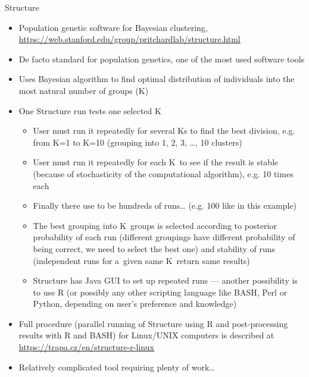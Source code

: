 \documentclass[compress, ucs, xelatex, 11pt, xcolor=svgnames,
  hyperref={
    bookmarks=true,
    unicode=true,
    colorlinks=true,
    pdftitle={Molecular data in R},
    plainpages=false,
    pdfauthor={Vojtech Zeisek},
    pdfsubject={Course about phylogeny and evolution in R},
    pdfcreator={XeLaTeX},
    pdfkeywords={R, evolution, phylogeny, molecular data},
    linkcolor=Tomato,
    anchorcolor=SaddleBrown,
    citecolor=Goldenrod,
    filecolor=DarkMagenta,
    menucolor=Sienna,
    urlcolor=DarkTurquoise,
    pdftex},
  url={hyphens, lowtilde} %
  ]{beamer}
\begin{document}
\begin{frame}[allowframebreaks]{Structure}
  \label{structure}
  \begin{itemize}
    \item Population genetic software for Bayesian clustering, \url{https://web.stanford.edu/group/pritchardlab/structure.html}
    \item De facto standard for population genetics, one of the most used software tools
    \item Uses Bayesian algorithm to find optimal distribution of individuals into the most natural number of groups (K)
    \item One Structure run tests one selected K
    \begin{itemize}
      \item User must run it repeatedly for several Ks to find the best division, e.g. from K=1 to K=10 (grouping into 1, 2, 3, \ldots, 10 clusters)
      \item User must run it repeatedly for each K~to see if the result is stable (because of stochasticity of the computational algorithm), e.g. 10 times each
      \item Finally there use to be hundreds of runs\ldots{ } (e.g. 100 like in this example)
      \item The best grouping into K~groups is selected according to posterior probability of each run (different groupings have different probability of being correct, we need to select the best one) and stability of runs (independent runs for a~given same K~return same results)
      \item Structure has Java GUI to set up repeated runs --- another possibility is to use R (or possibly any other scripting language like BASH, Perl or Python, depending on user's preference and knowledge)
    \end{itemize}
    \item Full procedure (parallel running of Structure using R and post-processing results with R and BASH) for Linux/UNIX computers is described at \url{https://trapa.cz/en/structure-r-linux}
    \item Relatively complicated tool requiring plenty of work\ldots
  \end{itemize}
\end{frame}
\end{document}

